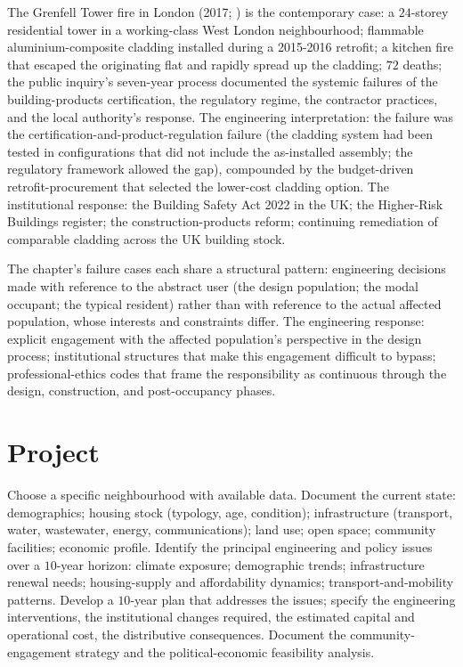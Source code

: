 The Grenfell Tower fire in London (2017; \cite{acc:grenfell-inquiry-2024}) is the contemporary case: a $24$-storey residential tower in a working-class West London neighbourhood; flammable aluminium-composite cladding installed during a 2015-2016 retrofit; a kitchen fire that escaped the originating flat and rapidly spread up the cladding; $72$ deaths; the public inquiry's seven-year process documented the systemic failures of the building-products certification, the regulatory regime, the contractor practices, and the local authority's response. The engineering interpretation: the failure was the certification-and-product-regulation failure (the cladding system had been tested in configurations that did not include the as-installed assembly; the regulatory framework allowed the gap), compounded by the budget-driven retrofit-procurement that selected the lower-cost cladding option. The institutional response: the Building Safety Act 2022 in the UK; the Higher-Risk Buildings register; the construction-products reform; continuing remediation of comparable cladding across the UK building stock.

\begin{principle}
The chapter's failure cases each share a structural pattern: engineering decisions made with reference to the abstract user (the design population; the modal occupant; the typical resident) rather than with reference to the actual affected population, whose interests and constraints differ. The engineering response: explicit engagement with the affected population's perspective in the design process; institutional structures that make this engagement difficult to bypass; professional-ethics codes that frame the responsibility as continuous through the design, construction, and post-occupancy phases.
\end{principle}

\section{Project}

\begin{project}
Choose a specific neighbourhood with available data. Document the current state: demographics; housing stock (typology, age, condition); infrastructure (transport, water, wastewater, energy, communications); land use; open space; community facilities; economic profile. Identify the principal engineering and policy issues over a $10$-year horizon: climate exposure; demographic trends; infrastructure renewal needs; housing-supply and affordability dynamics; transport-and-mobility patterns. Develop a $10$-year plan that addresses the issues; specify the engineering interventions, the institutional changes required, the estimated capital and operational cost, the distributive consequences. Document the community-engagement strategy and the political-economic feasibility analysis.
\end{project}

